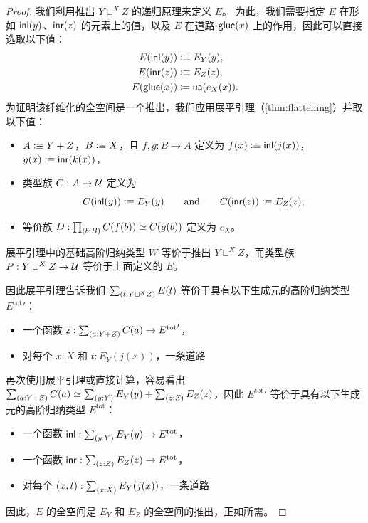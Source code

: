 \begin{proof}
  我们利用推出 $Y\sqcup^XZ$ 的递归原理来定义 $E$。
  为此，我们需要指定 $E$ 在形如 ${\mathsf{inl}}(y)$、${\mathsf{inr}}(z)$ 的元素上的值，以及 $E$ 在道路 $\mathsf{glue}(x)$ 上的作用，因此可以直接选取以下值：
  \begin{align*}
    E({\mathsf{inl}}(y)) & \vcentcolon\equiv E_Y(y),\\
    E({\mathsf{inr}}(z)) & \vcentcolon\equiv E_Z(z),\\
    {E}\mathopen{}\left({\mathsf{glue}(x)}\right)\mathclose{} & \coloneqq \mathsf{ua}(e_X(x)).
  \end{align*}
  为证明该纤维化的全空间是一个推出，我们应用展平引理（\cref{thm:flattening}）并取以下值：
  \begin{itemize}
  \item $A\vcentcolon\equiv Y+Z$，$B\vcentcolon\equiv X$，且 $f,g:B\to A$ 定义为
    $f(x)\vcentcolon\equiv{\mathsf{inl}}(j(x))$，$g(x)\vcentcolon\equiv{\mathsf{inr}}(k(x))$，
  \item 类型族 $C:A\to\mathcal{U}$ 定义为
    \begin{equation*}
      C({\mathsf{inl}}(y)) \vcentcolon\equiv E_Y(y)
      \qquad\text{and}\qquad
      C({\mathsf{inr}}(z)) \vcentcolon\equiv E_Z(z),
    \end{equation*}
  \item 等价族 $D:\prd{b:B}C(f(b))\eqvsym C(g(b))$ 定义为 $e_X$。
  \end{itemize}
  展平引理中的基础高阶归纳类型 $W$ 等价于推出 $Y\sqcup^XZ$，而类型族 $P:Y\sqcup^XZ\to\mathcal{U}$ 等价于上面定义的 $E$。

  因此展平引理告诉我们 $\sm{t:Y\sqcup^XZ}E(t)$ 等价于具有以下生成元的高阶归纳类型 ${E^{\mathrm{tot}}}'$：
  \begin{itemize}
  \item 一个函数 $\mathsf{z}:\sm{a:Y+Z}C(a)\to {E^{\mathrm{tot}}}'$，
  \item 对每个 $x:X$ 和 $t:E_Y(j(x))$，一条道路
  \end{itemize}
  再次使用展平引理或直接计算，容易看出 $\eqv{\sm{a:Y+Z}C(a)}{\sm{y:Y}E_Y(y)+\sm{z:Z}E_Z(z)}$，因此
  ${E^{\mathrm{tot}}}'$ 等价于具有以下生成元的高阶归纳类型 $E^{\mathrm{tot}}$：
  \begin{itemize}
  \item 一个函数 $\inl:\sm{y:Y}E_Y(y)\to E^{\mathrm{tot}}$，
  \item 一个函数 $\inr:\sm{z:Z}E_Z(z)\to E^{\mathrm{tot}}$，
  \item 对每个 $(x,t):\sm{x:X}E_Y(j(x))$，一条道路
  \end{itemize}
  因此，$E$ 的全空间是 $E_Y$ 和 $E_Z$ 的全空间的推出，正如所需。
\end{proof}

